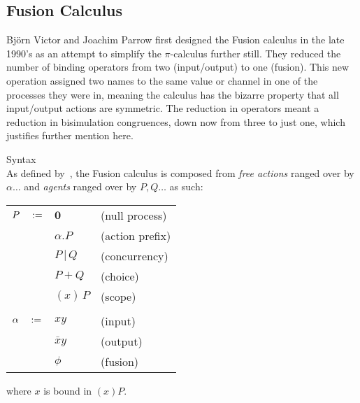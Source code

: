 \subsection{Fusion Calculus}

    Bj{\"o}rn Victor and Joachim Parrow first designed the Fusion calculus in the late 1990's as an attempt to simplify the $\pi$-calculus further still.
    They reduced the number of binding operators from two (input/output) to one (fusion).
    This new operation assigned two names to the same value or channel in one of the processes they were in, meaning the calculus has the bizarre property that all input/output actions are symmetric.
    The reduction in operators meant a reduction in bisimulation congruences, down now from three to just one, which justifies further mention here.
    
    \begin{definition}{Syntax\\}
        As defined by~\cite{fusion-calculus}, the Fusion calculus is composed from \textit{free actions} ranged over by $\alpha \ldots$ and \textit{agents} ranged over by $P, Q \ldots$ as such:
        \begin{center}
            \begin{tabular}{ l l l }
                $P \quad :=$    & $\textbf{0}$      & (null process) \\
                                    & $\alpha . P$      & (action prefix) \\
                                    & $P \, | \, Q$     & (concurrency) \\
                                    & $P + Q$           & (choice) \\
                                    & $(x) \, P$        & (scope) \\ \\

                $\alpha \quad :=$   & $x y$         & (input) \\
                                        & $\bar{x} y$   & (output) \\
                                        & $\phi$        & (fusion) \\
            \end{tabular}
        \end{center}
        where $x$ is bound in $(x)P$.
    \end{definition}


